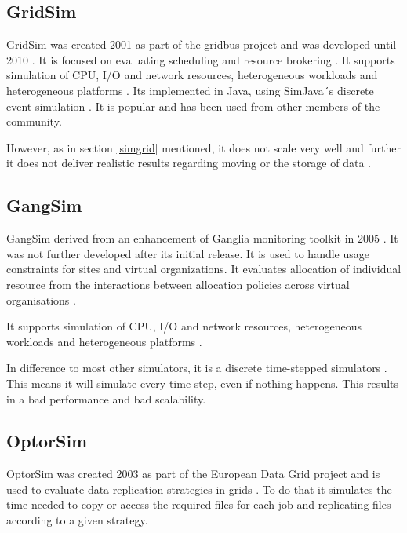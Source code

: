 \subsection{GridSim}
\label{gridsim}

GridSim was created 2001 as part of the gridbus project and was developed until 2010 \cite{gridsim}.
It is focused on evaluating scheduling and resource brokering \cite{al2012simulation}.
It supports simulation of CPU, I/O and network resources, heterogeneous workloads and heterogeneous platforms \cite{gridsim}. Its implemented in Java, using SimJava´s discrete event simulation  \cite{gridsim}.
It is popular and has been used from other members of the community. 

However, as in section \ref{simgrid} mentioned, it does not scale very well and further it does not deliver realistic results regarding moving or the storage of data \cite{1698650} .

\subsection{GangSim}

GangSim derived from an enhancement of Ganglia monitoring toolkit in 2005 \cite{dumitrescu2005gangsim}. It was not further developed after its initial release.
It is used to handle usage constraints for sites and virtual organizations. It evaluates allocation of individual resource from the interactions between allocation policies across virtual organisations \cite{dumitrescu2005gangsim}.

It supports simulation of CPU, I/O and network resources, heterogeneous workloads and heterogeneous platforms \cite{dumitrescu2005gangsim}.

In difference to most other simulators, it is a discrete time-stepped simulators \cite{dgsim}. This means it will simulate every time-step, even if nothing happens. This results in a bad performance and bad scalability.



\subsection{OptorSim}
OptorSim was created 2003 as part of the European Data Grid project and is used to evaluate data replication strategies in grids \cite{optorsim}. To do that it simulates the time needed to copy or access the required files for each job and replicating files according to a given strategy.

